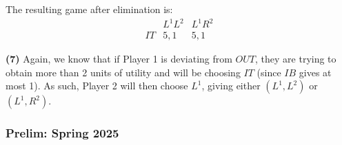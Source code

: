 \documentclass[11pt,english]{article}
\begin{document}
\begin{enumerate}
\begin{solution}
The resulting game after elimination is:
\[
\begin{array}{r|cc}
 & L^1L^2 & L^1R^2 \\ \hline
IT & 5,1 & 5,1
\end{array}
\]
 
\textbf{(7)} Again, we know that if Player 1 is deviating from $OUT$, they are
trying to obtain more than 2 units of utility and will be choosing $IT$ (since
$IB$ gives at most 1). As such, Player 2 will then choose $L^1$, giving
either $(L^1, L^2)$ or $(L^1, R^2)$.
\end{solution}
\end{enumerate}

\subsubsection{Prelim: Spring 2025}\label{Rustichini Prelim: Spring 2025}
\end{document}
